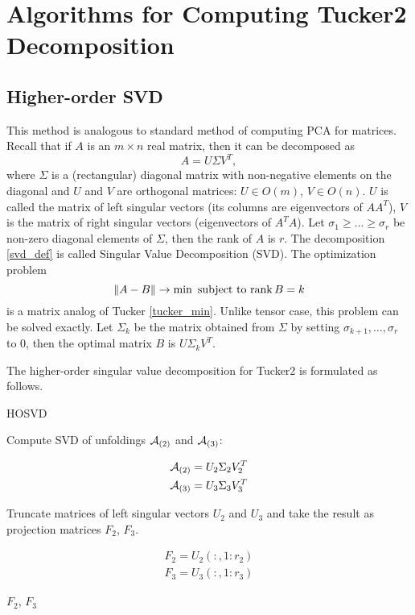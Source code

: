 \chapter{Algorithms for Computing Tucker2 Decomposition}
\label{chap_algo}



\section{Higher-order SVD}
\label{sec_hosvd}

This method is analogous to standard method of computing PCA for matrices.
Recall that if $A$ is an $m \times n$ real matrix, then it can be decomposed as 
\begin{equation}
\label{svd_def}
 A = U \Sigma V^T,
\end{equation}
where $\Sigma$ is a (rectangular) diagonal matrix with non-negative elements on the diagonal and $U$ and $V$ are orthogonal matrices: $U \in O(m)$, 
$V \in O(n)$. $U$ is called the matrix of left singular vectors (its columns are eigenvectors of $AA^T$), $V$ is the
matrix of right singular vectors (eigenvectors of $A^TA$). Let $ \sigma_1 \geq \dots \geq \sigma_r$ be non-zero diagonal elements of $\Sigma$, then the rank of $A$ is $r$. The decomposition \eqref{svd_def} 
is called Singular Value Decomposition (SVD). The optimization problem
\begin{equation}
\| A - B \| \to \min \mbox{ subject to $\operatorname*{rank} B = k $}
\end{equation}
is a matrix analog of Tucker \eqref{tucker_min}. Unlike tensor case, this problem can be solved exactly.
Let $\Sigma_k$ be  the matrix obtained from $\Sigma$ by setting $\sigma_{k+1}, \dots, \sigma_r$
to $0$, then the optimal matrix $B$ is $U \Sigma_k V^T$. 

The higher-order singular value decomposition for Tucker2 is formulated as follows.


\begin{algorithm}
\caption{HOSVD}\label{HOSVD}
\begin{algorithmic}[1]

\State Compute SVD of unfoldings $\mathcal{A}_{(2)}$ and $\mathcal{A}_{(3)}$:

\begin{eqnarray}
 \mathcal{A}_{(2)} = U_2 \Sigma_2 V_2^T  \\
 \mathcal{A}_{(3)} = U_3 \Sigma_3 V_3^T
\end{eqnarray}

\State Truncate matrices of left singular vectors $U_2$ and $U_3$ and take the result
as projection matrices $F_2$, $F_3$.

\begin{eqnarray}
F_2 = U_2(:, 1:r_2) \\
F_3= U_3(:, 1:r_3)
\end{eqnarray}


\State \Return $F_2$, $F_3$

\EndFunction
\end{algorithmic}
\end{algorithm}



